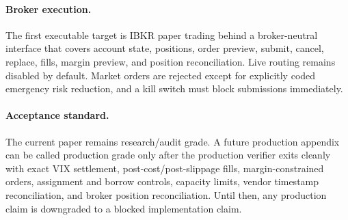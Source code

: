 \paragraph{Broker execution.}
The first executable target is IBKR paper trading behind a broker-neutral interface that
covers account state, positions, order preview, submit, cancel, replace, fills, margin
preview, and position reconciliation.  Live routing remains disabled by default.  Market
orders are rejected except for explicitly coded emergency risk reduction, and a kill switch
must block submissions immediately.

\paragraph{Acceptance standard.}
The current paper remains research/audit grade.  A future production appendix can be called
production grade only after the production verifier exits cleanly with exact VIX settlement,
post-cost/post-slippage fills, margin-constrained orders, assignment and borrow controls,
capacity limits, vendor timestamp reconciliation, and broker position reconciliation.  Until
then, any production claim is downgraded to a blocked implementation claim.
